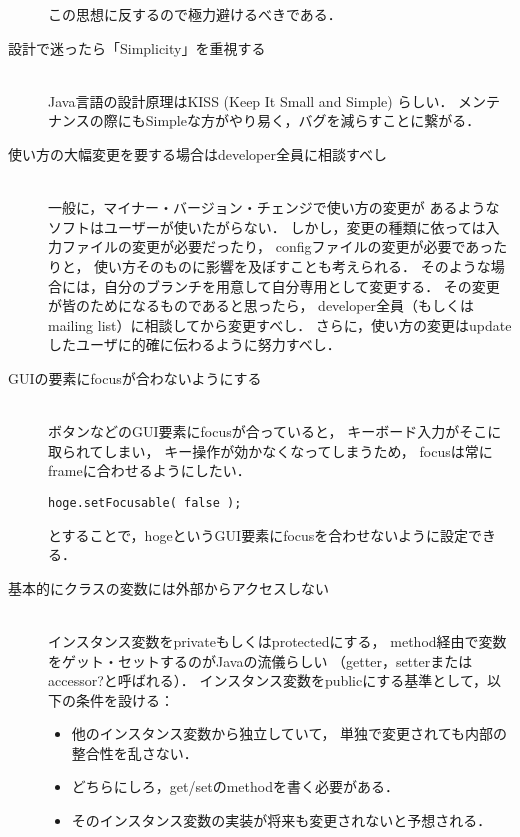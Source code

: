 \documentclass[a4j,openany]{jbook}
\begin{document}
\begin{description}
              この思想に反するので極力避けるべきである．
   \item[設計で迷ったら「Simplicity」を重視する] \mbox{} \\
              Java言語の設計原理はKISS (Keep It Small and Simple) らしい．
              メンテナンスの際にもSimpleな方がやり易く，バグを減らすことに繋がる．
   \item[使い方の大幅変更を要する場合はdeveloper全員に相談すべし] \mbox{} \\
              一般に，マイナー・バージョン・チェンジで使い方の変更が
              あるようなソフトはユーザーが使いたがらない．
              しかし，変更の種類に依っては入力ファイルの変更が必要だったり，
              configファイルの変更が必要であったりと，
              使い方そのものに影響を及ぼすことも考えられる．
              そのような場合には，自分のブランチを用意して自分専用として変更する．
              その変更が皆のためになるものであると思ったら，
              developer全員（もしくはmailing list）に相談してから変更すべし．
              さらに，使い方の変更はupdateしたユーザに的確に伝わるように努力すべし．
   \item[GUIの要素にfocusが合わないようにする] \mbox{} \\
              ボタンなどのGUI要素にfocusが合っていると，
              キーボード入力がそこに取られてしまい，
              キー操作が効かなくなってしまうため，
              focusは常にframeに合わせるようにしたい．
              \begin{screen}
\begin{verbatim}
hoge.setFocusable( false );
\end{verbatim}
              \end{screen}
              とすることで，hogeというGUI要素にfocusを合わせないように設定できる．
   \item[基本的にクラスの変数には外部からアクセスしない] \mbox{} \\
              インスタンス変数をprivateもしくはprotectedにする，
              method経由で変数をゲット・セットするのがJavaの流儀らしい
              （getter，setterまたはaccessor?と呼ばれる）．
              インスタンス変数をpublicにする基準として，以下の条件を設ける：
              \begin{itemize}
               \item 他のインスタンス変数から独立していて，
                     単独で変更されても内部の整合性を乱さない．
               \item どちらにしろ，get/setのmethodを書く必要がある．
               \item そのインスタンス変数の実装が将来も変更されないと予想される．
              \end{itemize}


\end{description}
\end{document}
